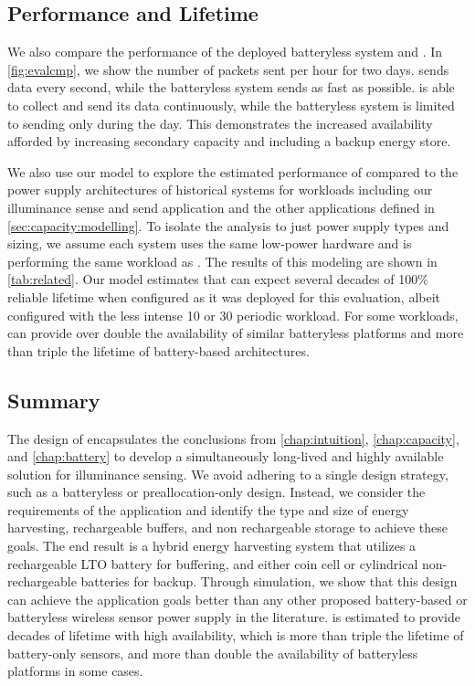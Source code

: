 \subsection{\name Performance and Lifetime}

\label{sec:eval:permamote}
We also compare the performance of the
deployed batteryless system and \name. In \cref{fig:evalcmp}, we show the
number of packets sent per hour for two days. \name sends data every
second, while the batteryless system sends as fast as possible. \name is
able to collect and send its data continuously, while the
batteryless system is limited to sending only during the day. This
demonstrates the increased availability afforded by increasing secondary
capacity and including a backup energy store.

We also use our model to explore the estimated performance of \name
compared to the power supply architectures of historical systems for workloads including our illuminance sense and send application and the other applications defined in \cref{sec:capacity:modelling}.
To isolate the analysis to just power supply types and sizing, we assume each
system uses the same low-power hardware and is performing the same workload as \name.
The results of this modeling are shown in \cref{tab:related}. 
Our model estimates that
\name can expect several decades of 100\% reliable lifetime when configured as
it was deployed for this evaluation, albeit configured with the less intense 10 or 30  periodic workload.
For some workloads, \name can provide over double the availability of similar batteryless platforms and more than triple the lifetime of battery-based architectures. 

\subsection{Summary}
The design of \name encapsulates the conclusions from \cref{chap:intuition}, \cref{chap:capacity}, and \cref{chap:battery} to develop a simultaneously long-lived and highly available solution for illuminance sensing.
We avoid adhering to a single design strategy, such as a batteryless or preallocation-only design.
Instead, we consider the requirements of the application and identify the type and size of energy harvesting, rechargeable buffers, and non rechargeable storage to achieve these goals.
The end result is a hybrid energy harvesting system that utilizes a rechargeable LTO battery for buffering, and either coin cell or cylindrical non-rechargeable batteries for backup.
Through simulation, we show that this design can achieve the application goals better than any other proposed battery-based or batteryless wireless sensor power supply in the literature.
\name is estimated to provide decades of lifetime with high availability, which is more than triple the lifetime of battery-only sensors, and more than double the availability of batteryless platforms in some cases.

